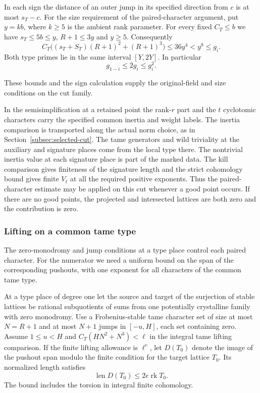 In each sign the distance of an outer jump in its
specified direction from \(c\) is at most \(s_T-c\).
For the size requirement of the paired-character
argument, put \(y=kb\), where \(k\ge5\) is the ambient rank parameter. For every fixed \(C_T\le b\)
we have \(s_T\le5b\le y\), \(R+1\le3y\) and \(y\ge5\).
Consequently
\[
 C_T\bigl((s_T+S_T)(R+1)^2+(R+1)^3\bigr)
 \le36y^4<y^8\le g_i.
\]
Both type primes lie in the same interval \([Y,2Y]\).
In particular
\[
 g_{1-i}\le2g_i\le g_i^2.
\]

These bounds and the sign calculation supply the original-field and size conditions on the cut family.
\label{cor:special-prime-lengths-1}

In the semisimplification at a retained point the
rank-\(r\) part and the \(t\) cyclotomic characters
carry the specified common inertia and weight labels.
The inertia comparison is transported along the actual
norm choice, as in Section~\ref{subsec:selected-cut}.
The tame generators and wild triviality at the auxiliary
and signature places come from the local type there.
The nontrivial inertia value at each signature place
is part of the marked data. The kill comparison gives
finiteness of the signature length and the strict
cohomology bound gives finite \(V_\ell\) at all the
required positive exponents. Thus the paired-character estimate may be applied on this cut whenever a good point occurs.
If there are no good points, the projected and intersected
lattices are both zero and the contribution is zero.
\label{cor:special-prime-lengths-2}

\subsubsection*{Lifting on a common tame type}

The zero-monodromy and jump conditions at a type place control each paired character. For the numerator we need a uniform bound on the span of the corresponding pushouts, with one exponent for all characters of the common tame type.

\begin{lemma}\label{lem:common-tame-pushout}
At a type place of degree one let the source and target of the
surjection of stable lattices be rational subquotients of sums from
one potentially crystalline family with zero monodromy. Use a
Frobenius-stable tame character set of size at most \(N=R+1\)
and at most \(N+1\) jumps in \([-u,H]\), each set containing zero.
Assume \(1\le u<H\) and \(C_T(HN^2+N^3)<\ell\) in the integral
tame lifting comparison. If the finite lifting allowance is \(\ell^e\), let \(D(T_0)\) denote the image of the pushout span modulo the finite condition for the target lattice \(T_0\). Its normalized length satisfies
\[
 \operatorname{len}D(T_0)\le2e\operatorname{rk}T_0.
\] The bound includes the torsion in
integral finite cohomology.
\end{lemma}

